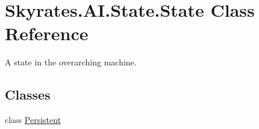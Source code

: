 \hypertarget{class_skyrates_1_1_a_i_1_1_state_1_1_state}{\section{Skyrates.\-A\-I.\-State.\-State Class Reference}
\label{class_skyrates_1_1_a_i_1_1_state_1_1_state}
}


A state in the overarching machine.  


\subsection*{Classes}
\begin{DoxyCompactItemize}
\item 
class \hyperlink{class_skyrates_1_1_a_i_1_1_state_1_1_state_1_1_persistent}{Persistent}
\end{DoxyCompactItemize}

